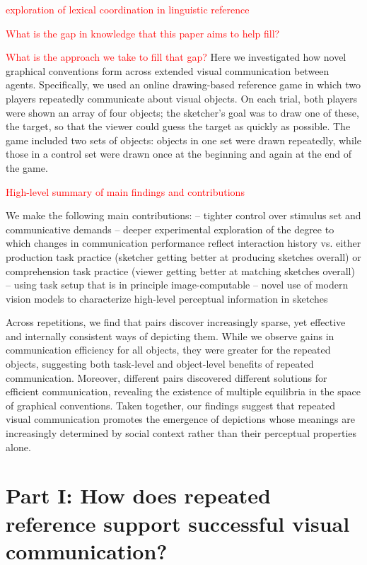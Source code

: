 \documentclass[10pt,letterpaper]{article}
\newcommand{\red}[1]{\textcolor{Red}{#1}}
\begin{document}
\red{exploration of lexical coordination in linguistic reference}
\cite{ClarkWilkesGibbs86_ReferringCollaborative}
\cite{HawkinsFrankGoodman17_ConventionFormation}

\red{What is the gap in knowledge that this paper aims to help fill?}

\red{What is the approach we take to fill that gap?}
Here we investigated how novel graphical conventions form across extended visual communication between agents. 
Specifically, we used an online drawing-based reference game in which two players repeatedly communicate about visual objects. 
On each trial, both players were shown an array of four objects; the sketcher’s goal was to draw one of these, the target, so that the viewer could guess the target as quickly as possible. 
The game included two sets of objects: objects in one set were drawn repeatedly, while those in a control set were drawn once at the beginning and again at the end of the game. 

\red{High-level summary of main findings and contributions}

We make the following main contributions:
-- tighter control over stimulus set and communicative demands
-- deeper experimental exploration of the degree to which changes in communication performance reflect interaction history vs. either production task practice (sketcher getting better at producing sketches overall) or comprehension task practice (viewer getting better at matching sketches overall)
-- using task setup that is in principle image-computable
-- novel use of modern vision models to characterize high-level perceptual information in sketches

Across repetitions, we find that pairs discover increasingly sparse, yet effective and internally consistent ways of depicting them. 
While we observe gains in communication efficiency for all objects, they were greater for the repeated objects, suggesting both task-level and object-level benefits of repeated communication. 
Moreover, different pairs discovered different solutions for efficient communication, revealing the existence of multiple equilibria in the space of graphical conventions. 
Taken together, our findings suggest that repeated visual communication promotes the emergence of depictions whose meanings are increasingly determined by social context rather than their perceptual properties alone.

\section{Part I: How does repeated reference support successful visual communication?}
\end{document}
